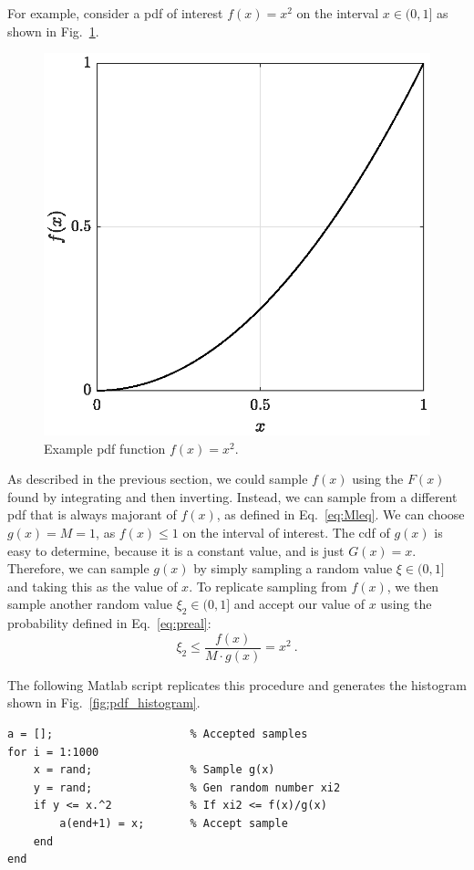 For example, consider a
\gls{pdf} of interest $f(x) = x^2$ on the interval $x \in (0,1]$ as shown
in Fig.~\ref{fig:circle_square}.
\begin{figure}[hbt]
  \centering
  \includegraphics[scale=0.75]{images/circle}
  \caption{Example \acrshort{pdf} function $f(x) = x^2$.}
  \label{fig:circle_square}
\end{figure}
As described in the previous section, we could sample $f(x)$ using the
$F(x)$ found by integrating and then inverting. Instead, we can sample from a
different \gls{pdf} that is always majorant of $f(x)$, as defined in
Eq.~\eqref{eq:Mleq}. We can choose $g(x) = M = 1$, as $f(x) \leq 1$ on
the interval of interest. The \gls{cdf} of $g(x)$ is easy to
determine, because it is a constant value, and is just $G(x) =
x$. Therefore, we can sample $g(x)$ by simply sampling a random value $\xi
\in (0,1]$ and taking this as the value of $x$. To replicate sampling
from $f(x)$, we then sample another random value $\xi_2 \in (0,1]$ and
accept our value of $x$ using the probability defined in Eq.~\eqref{eq:preal}:
\begin{equation*}
  \xi_2 \leq \frac{f(x)}{M \cdot g(x)} = x^2\:.
\end{equation*}
\begin{minipage}{1.0\linewidth}
The following Matlab script replicates this procedure and generates
the histogram shown in Fig.~\ref{fig:pdf_histogram}.
\begin{lstlisting}
a = [];                     % Accepted samples
for i = 1:1000
    x = rand;               % Sample g(x)
    y = rand;               % Gen random number xi2
    if y <= x.^2            % If xi2 <= f(x)/g(x)
        a(end+1) = x;       % Accept sample
    end
end
\end{lstlisting}
\end{minipage}
